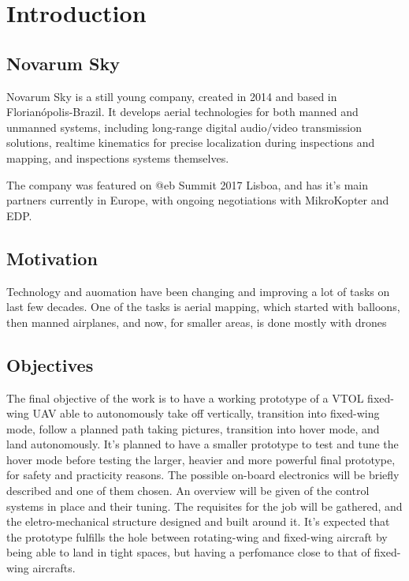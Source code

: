 

\chapter{Introduction} \label{chap:1}


\section{Novarum Sky}
	Novarum Sky is a still young company, created in 2014 and based in Florianópolis-Brazil. It develops aerial technologies for both manned and unmanned systems, including long-range digital audio/video transmission solutions, realtime kinematics for precise localization during inspections and mapping, and inspections systems themselves.

The company was featured on @eb Summit 2017 Lisboa, and has it's main partners currently in Europe, with ongoing negotiations with MikroKopter and EDP.

\section{Motivation}
Technology and auomation have been changing and improving a lot of tasks on last few decades.
%
One of the tasks is aerial mapping, which started with balloons, then manned airplanes, and now, for smaller areas, is done mostly with drones
%

%
%
% 
%
%


\section{Objectives}

%
The final objective of the work is to have a working prototype of a VTOL fixed-wing UAV able to autonomously take off vertically, transition into fixed-wing mode, follow a planned path taking pictures, transition into hover mode, and land autonomously.
%
It's planned to have a smaller prototype to test and tune the hover mode before testing the larger, heavier and more powerful final prototype, for safety and practicity reasons.
%
The possible on-board electronics will be briefly described and one of them chosen.
%
An overview will be given of the control systems in place and their tuning.
%
The requisites for the job will be gathered, and the eletro-mechanical structure designed and built around it.
%
It's expected that the prototype fulfills the hole between rotating-wing and fixed-wing aircraft by being able to land in tight spaces, but having a perfomance close to that of fixed-wing aircrafts. 

